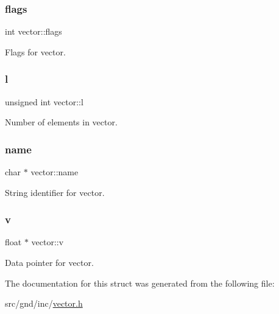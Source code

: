 \subsubsection{\texorpdfstring{flags}{flags}}
{\footnotesize\ttfamily int vector\+::flags}



Flags for vector. 

\mbox{\label{structvector_a95c5d324db1053c979145cea94d5263e}} 
\subsubsection{\texorpdfstring{l}{l}}
{\footnotesize\ttfamily unsigned int vector\+::l}



Number of elements in vector. 

\mbox{\label{structvector_a82a48e76e3d8d73bc769bdca1a80a382}} 
\subsubsection{\texorpdfstring{name}{name}}
{\footnotesize\ttfamily char $\ast$ vector\+::name}



String identifier for vector. 

\mbox{\label{structvector_a83630325b605afe4bf7532c82b86940d}} 
\subsubsection{\texorpdfstring{v}{v}}
{\footnotesize\ttfamily float $\ast$ vector\+::v}



Data pointer for vector. 



The documentation for this struct was generated from the following file\+:\begin{DoxyCompactItemize}
\item 
src/gnd/inc/\hyperlink{inc_2vector_8h}{vector.\+h}\end{DoxyCompactItemize}
